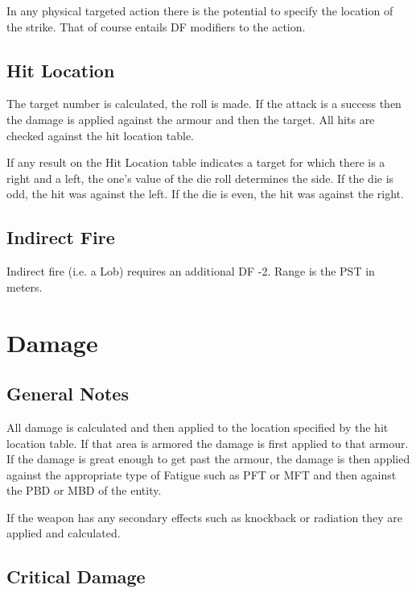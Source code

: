 In any physical targeted action there is the potential to specify the
location of the strike. That of course entails DF modifiers to the
action.
\index{}



\subsection{Hit Location}

The target number is calculated, the roll is made. If the attack
is a success then the damage is applied against the armour and then
the target.
All hits are checked against the hit location table.



If any result on the Hit Location table indicates a target for which there
is a right and a left, the one's value of the die roll determines the side.
If the die is odd, the hit was against the left. If the die is even, the hit
was against the right.

\subsection{Indirect Fire}

Indirect fire (i.e. a Lob) requires an additional DF -2. Range is the
PST in meters.

\section{{Damage}}

\subsection{General Notes}

All damage is calculated and then applied to the location specified
by the hit location table. If that area is armored the damage is
first applied to that armour. If the damage is great enough to get
past the armour, the damage is then applied against the
appropriate type of Fatigue such as PFT or MFT and then against the
PBD or MBD of the entity.

If the weapon has any secondary effects such as knockback or radiation
they are applied and calculated.

\subsection{Critical Damage}

